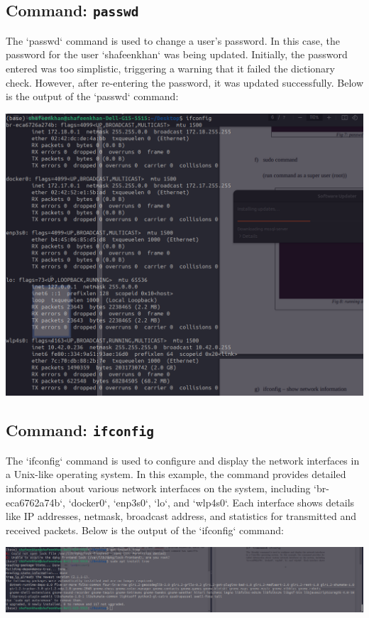 \documentclass{article}
\begin{document}
\subsection{Command: \texttt{passwd}}
The `passwd` command is used to change a user's password. In this case, the password for the user `shafeenkhan` was being updated. Initially, the password entered was too simplistic, triggering a warning that it failed the dictionary check. However, after re-entering the password, it was updated successfully. Below is the output of the `passwd` command:
\begin{center}
    \includegraphics[width=0.8\linewidth]{7.png}
\end{center}

\subsection{Command: \texttt{ifconfig}}
The `ifconfig` command is used to configure and display the network interfaces in a Unix-like operating system. In this example, the command provides detailed information about various network interfaces on the system, including `br-eca6762a74b`, `docker0`, `enp3s0`, `lo`, and `wlp4s0`. Each interface shows details like IP addresses, netmask, broadcast address, and statistics for transmitted and received packets. Below is the output of the `ifconfig` command:
\begin{center}
    \includegraphics[width=0.8\linewidth]{8.png}
\end{center}
\end{document}

